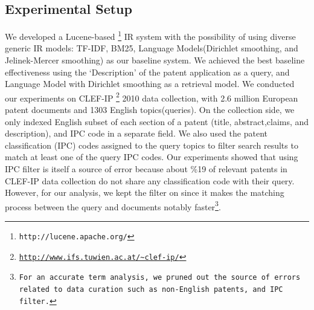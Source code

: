 \documentclass{sig-alternate}
\begin{document}
\subsection{Experimental Setup}
We developed a Lucene-based%
\footnote{\texttt{http://lucene.apache.org/}%
} IR system with the possibility of using diverse generic IR models: TF-IDF, BM25, Language Models(Dirichlet smoothing, and Jelinek-Mercer smoothing) as our baseline system. We achieved the best baseline effectiveness using the `Description' of the patent application as a query\cite{xue2009transforming}, and Language Model with Dirichlet smoothing as a retrieval model. We conducted our experiments on CLEF-IP%
\footnote{\texttt{\url{http://www.ifs.tuwien.ac.at/~clef-ip/}}}%
 2010 data collection, with 2.6 million European patent documents and 1303 English topics(queries). On the collection side, we only indexed English subset of each section of a patent (title, abstract,claims, and description), and IPC code in a separate field\cite{magdy2012toward}. We also used the patent classification (IPC) codes assigned to the query topics to filter search results to match at least one of the query IPC codes\cite{lopez2010patatras}. Our experiments showed that using IPC filter is itself a source of error because about \%19 of relevant patents in CLEF-IP data collection do not share any classification code with their query. However, for our analysis, we kept the filter on since it makes the matching process between the query and documents notably faster\footnote{\texttt{For an accurate term analysis, we pruned out the source of errors related to data curation such as non-English patents, and IPC filter.}%
}.
\end{document}
